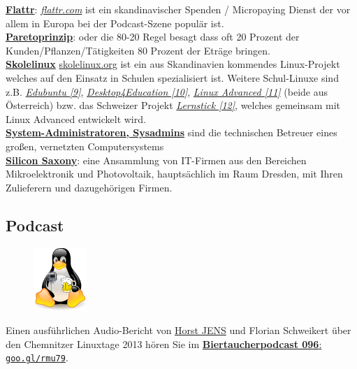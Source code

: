 \href{http://flattr.com}{\textbf{Flattr}}: \href{http://flattr.com}{\textit{flattr.com}} ist ein skandinavischer Spenden / Micropaying Dienst der vor allem in Europa bei der Podcast-Szene populär ist. \\

\href{http://de.wikipedia.org/wiki/Paretoprinzip}{\textbf{Paretoprinzip}}: oder die 80-20 Regel besagt dass oft 20 Prozent der Kunden/Pflanzen/Tätigkeiten 80 Prozent der Eträge bringen. \\

\href{http://www.skolelinux.org/}{\textbf{Skolelinux}} \href{http://skolelinux.org/}{skolelinux.org} ist ein aus Skandinavien kommendes Linux-Projekt welches auf den Einsatz in Schulen spezialisiert ist. Weitere Schul-Linuxe sind z.B. \href{http://www.edubuntu.org/}{\textit{Edubuntu [9]}}, \href{http://d4e.at/}{\textit{Desktop4Education [10]}}, \href{http://www.linuxadvanced.at/}{\textit{Linux Advanced [11]}} (beide aus Österreich) bzw. das Schweizer Projekt \href{http://www.imedias.ch/lernstick}{\textit{Lernstick [12]}}, welches gemeinsam mit Linux Advanced entwickelt wird. \\


\href{http://de.wikipedia.org/wiki/Systemadministrator}{\textbf{System-Administratoren, Sysadmins}} sind die technischen Betreuer eines großen, vernetzten Computersystems\\

\href{http://de.wikipedia.org/wiki/Silicon_Saxony}{\textbf{Silicon Saxony}}: eine Ansammlung von IT-Firmen aus den Bereichen Mikroelektronik und Photovoltaik, hauptsächlich im Raum Dresden, mit Ihren Zulieferern und dazugehörigen Firmen.

\subsection*{Podcast}
\begin{figure}
\includegraphics[width=2cm]{chemnitz/chemnitz-biertaucherlogo.png}
\end{figure}
Einen ausführlichen Audio-Bericht von \href{http://spielend-programmieren.at}{Horst JENS} und Florian Schweikert über den Chemnitzer Linuxtage 2013  hören Sie im \href{http://spielend-programmieren.at/de:podcast:biertaucher:2013:096}{\textbf{Biertaucherpodcast 096}: \texttt{goo.gl/rmu79}}. 

